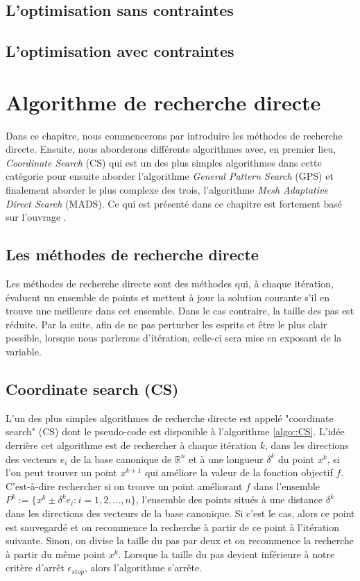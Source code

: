 \documentclass[french]{report}
\begin{document}
\section{L'optimisation sans contraintes}

\section{L'optimisation avec contraintes}






\chapter{Algorithme de recherche directe}\label{chapter:direct search}

Dans ce chapitre, nous commencerons par introduire les méthodes de recherche directe. Ensuite, nous aborderons différents algorithmes avec, en premier lieu, \textit{Coordinate Search } (CS) qui est un des plus simples algorithmes dans cette catégorie pour ensuite aborder l'algorithme \textit{General Pattern Search } (GPS) et finalement aborder le plus complexe des trois, l'algorithme \textit{Mesh Adaptative Direct Search} (MADS). Ce qui est présenté dans ce chapitre est fortement basé sur l'ouvrage \cite{AuHa2017a}.

\section{Les méthodes de recherche directe}
Les méthodes de recherche directe sont des méthodes qui, à chaque itération, évaluent un ensemble de points et mettent à jour la solution courante s'il en trouve une meilleure dans cet ensemble. Dans le cas contraire, la taille des pas est réduite. Par la suite, afin de ne pas perturber les esprits et être le plus clair possible, lorsque nous parlerons d'itération, celle-ci sera mise en exposant de la variable.

\section{Coordinate search (CS)}

L'un des plus simples algorithmes de recherche directe est appelé "coordinate search" (CS) dont le pseudo-code est disponible à l'algorithme \ref{algo::CS}. L'idée derrière cet algorithme est de rechercher à chaque itération $k$, dans les directions des vecteurs $e_i$ de la base canonique de $\mathbb{R}^n$ et à une longueur $\delta^k$ du point $x^k$, si l'on peut trouver un point $x^{k+1}$ qui améliore la valeur de la fonction objectif $f$. C'est-à-dire rechercher si on trouve un point améliorant $f$ dans l'ensemble $P^k := \{ x^k \pm \delta^k e_i : i=1,2,\dots,n\}$, l'ensemble des points situés à une distance $\delta^k$ dans les directions des vecteurs de la base canonique. Si c'est le cas, alors ce point est sauvegardé et on recommence la recherche à partir de ce point à l'itération suivante. Sinon, on divise la taille du pas par deux et on recommence la recherche à partir du même point $x^k$. Lorsque la taille du pas devient inférieure à notre critère d'arrêt $\epsilon_{stop}$, alors l'algorithme s'arrête.
\end{document}
